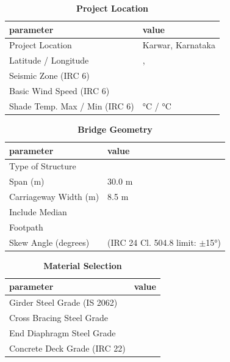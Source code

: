 \documentclass[12pt,a4paper]{report}
\numberwithin{table}{chapter}
\numberwithin{figure}{chapter}
\begin{document}
\begin{table}[H]
\caption{\textbf{Project Location}}
\label{subsec:project-location}
\begin{tabular}{|L{5.5cm}|L{8.5cm}|}
\hline
\textbf{parameter} & \textbf{value} \\
\hline
\textnormal{Project Location} & Karwar, Karnataka \\
\hline
\textnormal{Latitude / Longitude} & ,  \\
\hline
\textnormal{Seismic Zone (IRC 6)} &  \\
\hline
\textnormal{Basic Wind Speed (IRC 6)} &  \\
\hline
\textnormal{Shade Temp. Max / Min (IRC 6)} &  °C /  °C \\
\hline
\end{tabular}
\vspace{0.4cm}
\end{table}

\begin{table}[H]
\caption{\textbf{Bridge Geometry}}
\label{subsec:bridge-geometry}
\begin{tabular}{|L{5.5cm}|L{8.5cm}|}
\hline
\textbf{parameter} & \textbf{value} \\
\hline
\textnormal{Type of Structure} &  \\
\hline
\textnormal{Span (m)} & 30.0 m \\
\hline
\textnormal{Carriageway Width (m)} & 8.5 m \\
\hline
\textnormal{Include Median} &  \\
\hline
\textnormal{Footpath} &  \\
\hline
\textnormal{Skew Angle (degrees)} &  (IRC 24 Cl. 504.8 limit: $\pm$15°) \\
\hline
\end{tabular}
\end{table}
\vspace{0.4cm}

\begin{table}[H]
\caption{\textbf{Material Selection}}
\label{subsec:material}
\begin{tabular}{|L{5.5cm}|L{8.5cm}|}
\hline
\textbf{parameter} & \textbf{value} \\
\hline
\textnormal{Girder Steel Grade (IS 2062)} &  \\
\hline
\textnormal{Cross Bracing Steel Grade} &  \\
\hline
\textnormal{End Diaphragm Steel Grade} &  \\
\hline
\textnormal{Concrete Deck Grade (IRC 22)} &  \\
\hline
\end{tabular}
\end{table}
\vspace{0.4cm}
\end{document}
